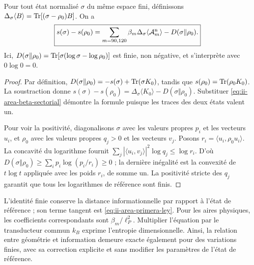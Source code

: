 \begin{theorem}
\label{thm:ii-area-ley-finita}
Pour tout état normalisé \(\sigma\) du même espace fini,
définissons \(\Delta_\sigma\langle B\rangle
=\operatorname{Tr}[(\sigma-\rho_0)B]\). On a
\begin{equation}
 \boxed{
 s(\sigma)-s(\rho_0)
 =\sum_{m=90,120}\beta_m
      \Delta_\sigma\langle\mathcal A_m^{\rm n}\rangle
   -D(\sigma\Vert\rho_0).}
 \label{eq:ii-area-ley-finita}
\end{equation}
Ici, \(D(\sigma\Vert\rho_0)=\operatorname{Tr}[\sigma(\log\sigma-\log\rho_0)]\)
est finie, non négative, et s'interprète avec \(0\log0=0\).
\end{theorem}
\begin{proof}
Par définition,
\(D(\sigma\Vert\rho_0)=-s(\sigma)+\operatorname{Tr}(\sigma K_0)\), tandis que
\(s(\rho_0)=\operatorname{Tr}(\rho_0K_0)\). La soustraction donne
\(s(\sigma)-s(\rho_0)=\Delta_\sigma\langle K_0\rangle
-D(\sigma\Vert\rho_0)\). Substituer
\eqref{eq:ii-area-beta-sectorial} démontre la formule puisque les
traces des deux états valent un.

Pour voir la positivité, diagonalisons \(\sigma\) avec les valeurs propres
\(p_i\) et les vecteurs \(u_i\), et \(\rho_0\) avec les valeurs propres
\(q_j>0\) et les vecteurs \(v_j\). Posons
\(r_i=\langle u_i,\rho_0u_i\rangle\). La concavité du logarithme
fournit
\(\sum_j|\langle u_i,v_j\rangle|^2\log q_j\le\log r_i\).
D'où
\(D(\sigma\Vert\rho_0)\ge\sum_i p_i\log(p_i/r_i)\ge0\) ;
la dernière inégalité est la convexité de \(t\log t\) appliquée
avec les poids \(r_i\), de somme un. La positivité stricte des
\(q_j\) garantit que tous les logarithmes de référence sont finis.
\end{proof}

L’identité finie conserve la distance informationnelle par rapport à
l’état de référence ; son terme tangent est
\eqref{eq:ii-area-primera-ley}. Pour les aires physiques, les
coefficients correspondants sont \(\beta_m/\ell_P^2\).
Multiplier l’équation par le transducteur commun \(k_B\) exprime
l’entropie dimensionnelle. Ainsi, la relation entre géométrie et information
demeure exacte également pour des variations finies, avec sa correction
explicite et sans modifier les paramètres de l’état de référence.
